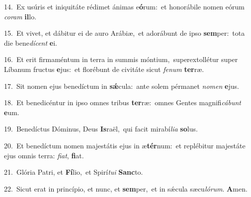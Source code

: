 {\numbfont\textcolor{\numbcolor}{14.}}~Ex usúris et iniquitáte rédimet ánimas e\-\textbf{ó}\-rum:~\star et honorábile nomen eórum \textit{co}\-\textit{ram} \textbf{il}\-lo.\par
{\numbfont\textcolor{\numbcolor}{15.}}~Et vivet, et dábitur ei de auro Arábiæ,~\dagger et adorábunt de ipso \textbf{sem}\-per:~\star tota die bene\-\textit{dí}\-\textit{cent} \textbf{e}\-i.\par
{\numbfont\textcolor{\numbcolor}{16.}}~Et erit firmaméntum in terra in summis móntium,~\dagger superextollétur super Líbanum fructus \textbf{e}\-jus:~\star et florébunt de civitáte sicut \textit{fe}\-\textit{num} \textbf{ter}\-ræ.\par
{\numbfont\textcolor{\numbcolor}{17.}}~Sit nomen ejus benedíctum in \textbf{sǽ}\-cula:~\star ante solem pérmanet \textit{no}\-\textit{men} \textbf{e}\-jus.\par
{\numbfont\textcolor{\numbcolor}{18.}}~Et benedicéntur in ipso omnes tribus \textbf{ter}\-ræ:~\star omnes Gentes magnifi\-\textit{cá}\-\textit{bunt} \textbf{e}\-um.\par
{\numbfont\textcolor{\numbcolor}{19.}}~Benedíctus Dóminus, Deus \textbf{Is}\-raël,~\star qui facit mirabí\-\textit{li}\-\textit{a} \textbf{so}\-lus.\par
{\numbfont\textcolor{\numbcolor}{20.}}~Et benedíctum nomen majestátis ejus in æ\-\textbf{tér}\-num:~\star et replébitur majestáte ejus omnis terra: \textit{fi}\-\textit{at}, \textbf{fi}\-at.\par
{\numbfont\textcolor{\numbcolor}{21.}}~Glória Patri, et \textbf{Fí}\-lio,~\star et Spirí\-\textit{tu}\-\textit{i} \textbf{Sanc}\-to.\par
{\numbfont\textcolor{\numbcolor}{22.}}~Sicut erat in princípio, et nunc, et \textbf{sem}\-per,~\star et in sǽcula sæcu\-\textit{ló}\-\textit{rum}. \textbf{A}\-men.\par
